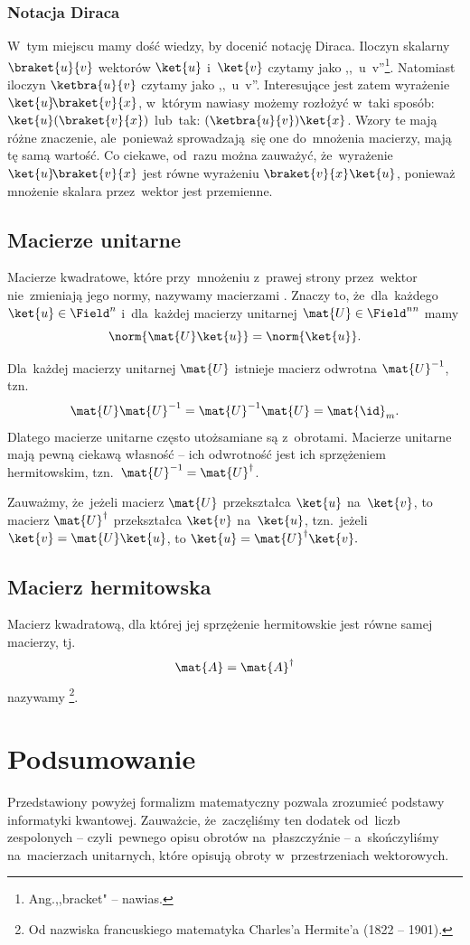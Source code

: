 \subsubsection{Notacja Diraca}
W~tym miejscu mamy dość wiedzy, by docenić notację Diraca. Iloczyn skalarny
$\braket{u}{v}$ wektorów $\ket{u}$ i~$\ket{v}$ czytamy jako
,,~u~v''\footnote{Ang.,,bracket" -- nawias.}.
Natomiast iloczyn $\ketbra{u}{v}$ czytamy jako
,,~u~v''. Interesujące jest zatem wyrażenie
$\ket{u}\!\braket{v}{x}$, w~którym nawiasy możemy rozłożyć w~taki sposób:
$\ket{u}(\braket{v}{x})$ lub~tak: $(\ketbra{u}{v})\ket{x}$. Wzory te mają różne
znaczenie, ale~ponieważ sprowadzają~się one do~mnożenia macierzy, mają tę samą
wartość. Co ciekawe, od~razu można zauważyć, że~wyrażenie
$\ket{u}\!\braket{v}{x}$ jest równe wyrażeniu $\braket{v}{x}\ket{u}$, ponieważ
mnożenie skalara przez~wektor jest przemienne.


\subsection{Macierze unitarne}
Macierze kwadratowe, które przy~mnożeniu z~prawej strony przez~wektor
nie~zmieniają jego normy, nazywamy macierzami
.
Znaczy to, że~dla~każdego $\ket{u}\in \Field^{n}$ i~dla~każdej macierzy
unitarnej $\mat{U}\in \Field^{nn}$ mamy
$$
	\norm{\mat{U}\ket{u}}=\norm{\ket{u}}.
$$

Dla~każdej macierzy unitarnej $\mat{U}$ istnieje macierz odwrotna $\mat{U}^{-1}$, tzn.
$$
	\mat{U}\mat{U}^{-1} = \mat{U}^{-1}\mat{U} = \mat{\id}_m.
$$
Dlatego macierze unitarne często utożsamiane są z~obrotami.
Macierze unitarne mają pewną ciekawą własność -- ich odwrotność jest ich
sprzężeniem hermitowskim, tzn.~$\mat{U}^{-1} = \mat{U}^\dagger$.

Zauważmy, że~jeżeli macierz $\mat{U}$ przekształca $\ket{u}$ na~$\ket{v}$, to
macierz $\mat{U}^\dagger$ przekształca $\ket{v}$ na~$\ket{u}$, tzn.~jeżeli
$\ket{v} = \mat{U}\ket{u}$, to $\ket{u} = \mat{U}^\dagger\ket{v}.$

\subsection{Macierz hermitowska}
Macierz kwadratową, dla której jej sprzężenie hermitowskie jest równe samej macierzy, tj.
$$
	\mat{A} = \mat{A}^\dagger
$$
nazywamy \footnote{Od nazwiska francuskiego matematyka Charles'a Hermite'a (1822 -- 1901).}.

\section{Podsumowanie}
Przedstawiony powyżej formalizm matematyczny pozwala zrozumieć podstawy
informatyki kwantowej.
Zauważcie, że~zaczęliśmy ten dodatek od~liczb zespolonych -- czyli~pewnego opisu
obrotów na~płaszczyźnie -- a~skończyliśmy na~macierzach unitarnych, które opisują
obroty w~przestrzeniach wektorowych.

